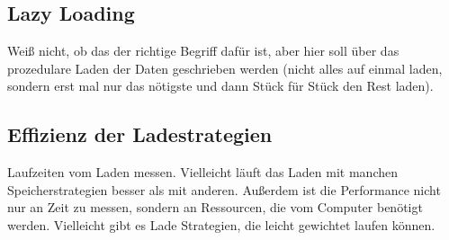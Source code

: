 \subsection{Lazy Loading}
Weiß nicht, ob das der richtige Begriff dafür ist, aber hier soll über das prozedulare 
Laden der Daten geschrieben werden (nicht alles auf einmal laden, sondern erst mal nur das
nötigste und dann Stück für Stück den Rest laden). 


\subsection{Effizienz der Ladestrategien}
Laufzeiten vom Laden messen. Vielleicht läuft das Laden mit manchen Speicherstrategien 
besser als mit anderen. Außerdem ist die Performance nicht nur an Zeit zu messen, sondern
an Ressourcen, die vom Computer benötigt werden. Vielleicht gibt es Lade Strategien, die
leicht gewichtet laufen können.